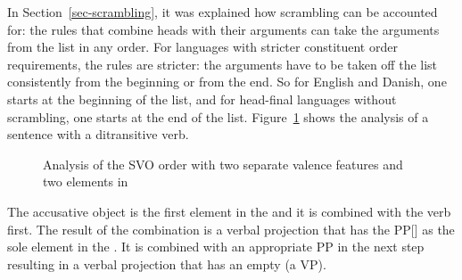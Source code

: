 In Section~\ref{sec-scrambling}, it was explained how scrambling can be accounted for: the rules that
combine heads with their arguments can take the arguments from the list in any order. For languages
with stricter constituent order requirements, the rules are stricter: the arguments have to be taken
off the list consistently from the beginning or from the end. So for English and Danish, one starts
at the beginning of the list, and for head-final languages without scrambling, one starts at the end
of the list. Figure~\ref{fig-svo-ditrans} shows the analysis of a sentence with a ditransitive verb.
\begin{figure}
\caption{\label{fig-svo-ditrans}Analysis of the SVO order with two separate valence features and two
  elements in \comps}
\end{figure}
The accusative object is the first element in the \compsl and it is combined with the verb
first. The result of the combination is a verbal projection that has the PP[] as the sole
element in the \compsl. It is combined with an appropriate PP in the next step resulting in a verbal
projection that has an empty \compsl (a VP).


